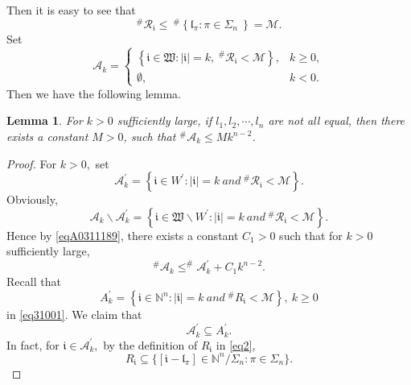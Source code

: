 \documentclass[11pt]{article}
\theoremstyle{plain}
\newtheorem{lem}[thm]{Lemma}
\theoremstyle{definition}
\begin{document}
{\begin{equation}
\end{equation}
Then it is easy to see that
\begin{equation}\label{eq31211}
	^{\#  }	\mathcal{R}_{\mathfrak{i}  }  \le
	\ ^{\#  }	\left \{ \mathfrak{l}_\pi:\pi \in \Sigma_{n}\ \right \}   = \mathscr{M}.
\end{equation}
Set
 \begin{equation}\label{eqA311}
	\mathcal{A}_{k} = \begin{cases}
		\left \{ \mathfrak{i}\in \mathfrak{W}:  | \mathfrak{i}  |=k, \ ^{\#  }	\mathcal{R}_{\mathfrak{i}} <\mathscr{M}    \right \},& k \geq 0, \\
		\emptyset,& k < 0.
	\end{cases}
\end{equation}
Then we have the following lemma.
\begin{lem}\label{lemma33}
	For $k>0$ sufficiently large, if $l_{1},  l_{2},\cdots,l_{n}$ are not all equal, then there exists a constant $M>0$, such that $^{\#  }\mathcal{A}_{k} \le Mk^{n-2}$.
\end{lem}
\begin{proof} 
For $k>0,$ set 
\begin{equation}\label{eqA3111}
	\mathcal{A}_{k}^{\prime} =
		\left \{ \mathfrak{i} \in  W^{\prime}: | \mathfrak{i}  |=k \ and \ ^{\#  }	\mathcal{R}_{\mathfrak{i}  } <\mathscr{M}    \right \}.
\end{equation}
Obviously, 
$$\mathcal{A}_{k}\backslash \mathcal{A}_{k}^{\prime}=\left \{ \mathfrak{i} \in  \mathfrak{W} \backslash W^{\prime}: | \mathfrak{i}  |=k \ and \ ^{\#  }	\mathcal{R}_{\mathfrak{i}  } <\mathscr{M}    \right \}.$$
Hence by \eqref{eqA0311189}, there exists a constant $C_{1} > 0$ such that for $k> 0$ sufficiently large,
\begin{equation}\label{eqA03111}^{\#  }\mathcal{A}_{k}\leq ^{\#  }\mathcal{A}_{k}^{\prime}+ C_1k^{n-2}.\end{equation}
Recall that $$A_{k}^{\prime}=\left \{  \mathfrak{i} \in \mathbb{N}^n: | \mathfrak{i}  |=k \ and \ ^{\#  }	R_{\mathfrak{i}  } <\mathscr{M}    \right \},~ k \geq 0$$ in \eqref{eq31001}.
We claim that \begin{equation}\label{eqA003111}\mathcal{A}_{k}^{\prime} \subseteq  A_{k}^{\prime}.\end{equation}
In fact, for $\mathfrak{i} \in \mathcal{A}_{k}^{\prime},$ by the definition of $R_{\mathfrak{i}}$ in \eqref{eq2}, 
\begin{equation}\label{eqBURHUA}	R_{\mathfrak{i}  }\subseteq \{[\mathfrak{i}- \mathfrak{l}_{\pi}] \in \mathbb N^n/\Sigma_n : \pi \in \Sigma_n\}.\end{equation}

\end{proof}}
\end{document}
